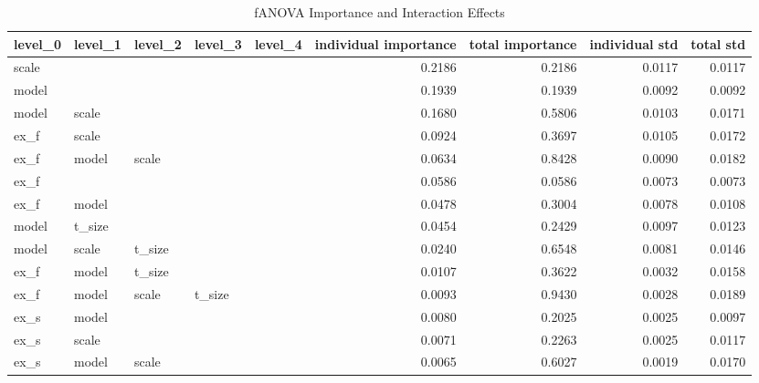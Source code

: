 \begin{table}
\centering
\caption{fANOVA Importance and Interaction Effects}
\label{tab:fanova_importance_ngf}
\begin{tabular}{lllllrrrr}
\toprule
level\_0 & level\_1 & level\_2 & level\_3 & level\_4 & individual importance & total importance & individual std & total std \\
\midrule
  scale &         &         &         &         &                0.2186 &           0.2186 &         0.0117 &    0.0117 \\
  model &         &         &         &         &                0.1939 &           0.1939 &         0.0092 &    0.0092 \\
  model &   scale &         &         &         &                0.1680 &           0.5806 &         0.0103 &    0.0171 \\
   ex\_f &   scale &         &         &         &                0.0924 &           0.3697 &         0.0105 &    0.0172 \\
   ex\_f &   model &   scale &         &         &                0.0634 &           0.8428 &         0.0090 &    0.0182 \\
   ex\_f &         &         &         &         &                0.0586 &           0.0586 &         0.0073 &    0.0073 \\
   ex\_f &   model &         &         &         &                0.0478 &           0.3004 &         0.0078 &    0.0108 \\
  model &  t\_size &         &         &         &                0.0454 &           0.2429 &         0.0097 &    0.0123 \\
  model &   scale &  t\_size &         &         &                0.0240 &           0.6548 &         0.0081 &    0.0146 \\
   ex\_f &   model &  t\_size &         &         &                0.0107 &           0.3622 &         0.0032 &    0.0158 \\
   ex\_f &   model &   scale &  t\_size &         &                0.0093 &           0.9430 &         0.0028 &    0.0189 \\
   ex\_s &   model &         &         &         &                0.0080 &           0.2025 &         0.0025 &    0.0097 \\
   ex\_s &   scale &         &         &         &                0.0071 &           0.2263 &         0.0025 &    0.0117 \\
   ex\_s &   model &   scale &         &         &                0.0065 &           0.6027 &         0.0019 &    0.0170 \\

\end{tabular}
\end{table}

